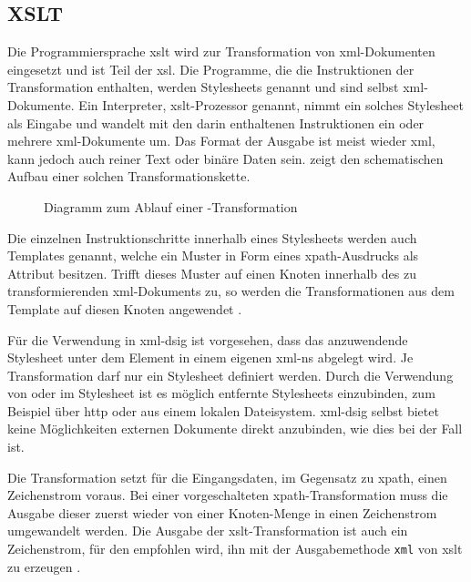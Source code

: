 \subsection{XSLT}
\label{sec:XML-DSig:Transformationen:XSLT}
Die Programmiersprache \gls{xslt} wird zur Transformation von \gls{xml}-Dokumenten eingesetzt und ist Teil der \gls{xsl}. Die Programme, die die Instruktionen der
Transformation enthalten, werden Stylesheets genannt und sind selbst \gls{xml}-Dokumente. Ein Interpreter, \gls{xslt}-Prozessor genannt, nimmt ein solches Stylesheet
als Eingabe und wandelt mit den darin enthaltenen Instruktionen ein oder mehrere \gls{xml}-Dokumente um. Das Format der Ausgabe ist meist wieder \gls{xml}, kann jedoch 
auch reiner Text oder binäre Daten sein.  zeigt den schematischen Aufbau einer solchen Transformationskette.

\begin{figure}
    \centering
    
    \caption{Diagramm zum Ablauf einer \texorpdfstring{\protect{}}{XSLT}-Transformation}
    \label{fig:xslt-processing}
\end{figure}

Die einzelnen Instruktionschritte innerhalb eines Stylesheets werden auch Templates genannt, welche ein Muster in Form eines \gls{xpath}-Ausdrucks als Attribut besitzen. 
Trifft dieses Muster auf einen Knoten innerhalb des zu transformierenden \gls{xml}-Dokuments zu, so werden die Transformationen  aus dem Template auf diesen Knoten 
angewendet \cite{xslt:w3c}.

Für die Verwendung in \gls{xml-dsig} ist vorgesehen, dass das anzuwendende Stylesheet unter dem Element  in einem eigenen \gls{xml-ns} abgelegt wird.
Je Transformation darf nur ein Stylesheet definiert werden. Durch die Verwendung von  oder  im Stylesheet ist es möglich 
entfernte Stylesheets einzubinden, zum Beispiel über \gls{http} oder aus einem lokalen Dateisystem. \gls{xml-dsig} selbst bietet keine Möglichkeiten externen Dokumente 
direkt anzubinden, wie dies bei  der Fall ist. 

Die Transformation setzt für die Eingangsdaten, im Gegensatz zu \gls{xpath}, einen Zeichenstrom voraus. Bei einer vorgeschalteten \gls{xpath}-Transformation muss 
die Ausgabe dieser zuerst wieder von einer Knoten-Menge in einen Zeichenstrom umgewandelt werden. Die Ausgabe der \gls{xslt}-Transformation ist auch ein Zeichenstrom, 
für den empfohlen wird, ihn mit der Ausgabemethode \texttt{xml} von \gls{xslt} zu erzeugen \cite{xml-dsig:w3c}.

